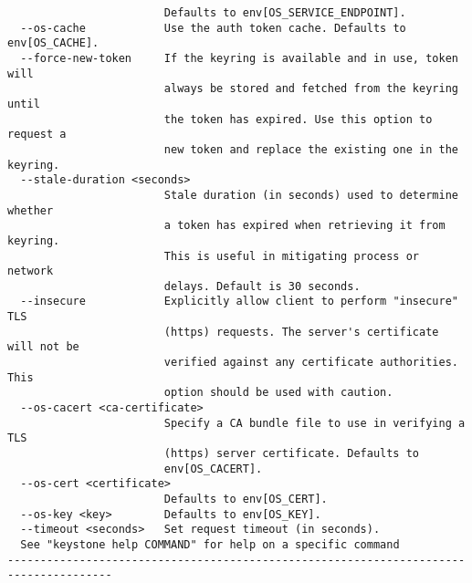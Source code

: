 \documentclass[a4paper,left=1.5cm,right=1.5cm,11pt]{article}
\begin{document}
\begin{lstlisting}
                        Defaults to env[OS_SERVICE_ENDPOINT].
  --os-cache            Use the auth token cache. Defaults to env[OS_CACHE].
  --force-new-token     If the keyring is available and in use, token will
                        always be stored and fetched from the keyring until
                        the token has expired. Use this option to request a
                        new token and replace the existing one in the keyring.
  --stale-duration <seconds>
                        Stale duration (in seconds) used to determine whether
                        a token has expired when retrieving it from keyring.
                        This is useful in mitigating process or network
                        delays. Default is 30 seconds.
  --insecure            Explicitly allow client to perform "insecure" TLS
                        (https) requests. The server's certificate will not be
                        verified against any certificate authorities. This
                        option should be used with caution.
  --os-cacert <ca-certificate>
                        Specify a CA bundle file to use in verifying a TLS
                        (https) server certificate. Defaults to
                        env[OS_CACERT].
  --os-cert <certificate>
                        Defaults to env[OS_CERT].
  --os-key <key>        Defaults to env[OS_KEY].
  --timeout <seconds>   Set request timeout (in seconds).
  See "keystone help COMMAND" for help on a specific command
--------------------------------------------------------------------------------------
\end{lstlisting}
\end{document}
